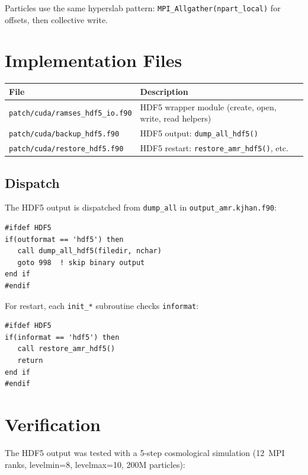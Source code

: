 \documentclass[11pt,fleqn]{book}
\begin{document}
Particles use the same hyperslab pattern: \texttt{MPI\_Allgather(npart\_local)} for offsets, then collective write.


\section{Implementation Files}

\begin{center}
\begin{tabular}{ll}
\toprule
\textbf{File} & \textbf{Description} \\
\midrule
\texttt{patch/cuda/ramses\_hdf5\_io.f90} & HDF5 wrapper module (create, open, write, read helpers) \\
\texttt{patch/cuda/backup\_hdf5.f90} & HDF5 output: \texttt{dump\_all\_hdf5()} \\
\texttt{patch/cuda/restore\_hdf5.f90} & HDF5 restart: \texttt{restore\_amr\_hdf5()}, etc. \\
\bottomrule
\end{tabular}
\end{center}

\subsection{Dispatch}

The HDF5 output is dispatched from \texttt{dump\_all} in \texttt{output\_amr.kjhan.f90}:

\begin{lstlisting}[style=fortran,numbers=none]
#ifdef HDF5
if(outformat == 'hdf5') then
   call dump_all_hdf5(filedir, nchar)
   goto 998  ! skip binary output
end if
#endif
\end{lstlisting}

For restart, each \texttt{init\_*} subroutine checks \texttt{informat}:

\begin{lstlisting}[style=fortran,numbers=none]
#ifdef HDF5
if(informat == 'hdf5') then
   call restore_amr_hdf5()
   return
end if
#endif
\end{lstlisting}


\section{Verification}

The HDF5 output was tested with a 5-step cosmological simulation (12~MPI ranks, levelmin=8, levelmax=10, 200M particles):
\end{document}
